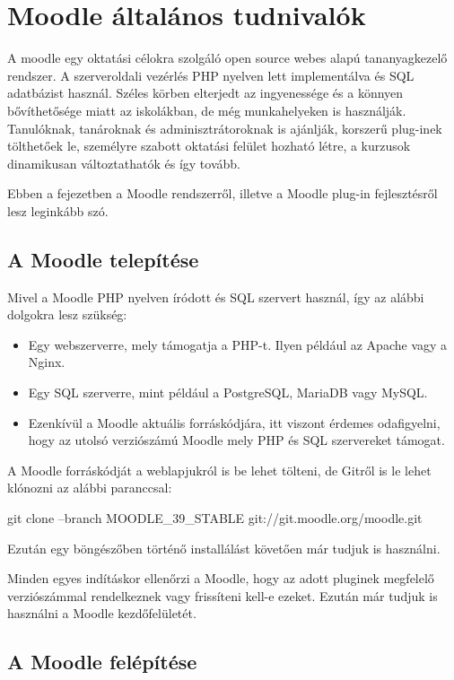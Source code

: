 \chapter{Moodle általános tudnivalók}

A moodle egy oktatási célokra szolgáló open source webes alapú tananyagkezelő rendszer. A szerveroldali vezérlés PHP nyelven lett implementálva és SQL adatbázist használ. Széles körben elterjedt az ingyenessége és a könnyen bővíthetősége miatt az iskolákban, de még munkahelyeken is használják. Tanulóknak, tanároknak és adminisztrátoroknak is ajánlják, korszerű plug-inek tölthetőek le, személyre szabott oktatási felület hozható létre, a kurzusok dinamikusan változtathatók és így tovább. \par
Ebben a fejezetben a Moodle rendszerről, illetve a Moodle plug-in fejlesztésről lesz leginkább szó.

\section{A Moodle telepítése}

Mivel a Moodle PHP nyelven íródott és SQL szervert használ, így az alábbi dolgokra lesz szükség:
\begin{itemize}
    \item Egy webszerverre, mely támogatja a PHP-t. Ilyen például az Apache vagy a Nginx.
    \item Egy SQL szerverre, mint például a PostgreSQL, MariaDB vagy MySQL.
    \item Ezenkívül a Moodle aktuális forráskódjára, itt viszont érdemes odafigyelni, hogy az utolsó verziószámú Moodle mely PHP és SQL szervereket támogat.
\end{itemize}

A Moodle forráskódját a weblapjukról is be lehet tölteni, de Gitről is le lehet klónozni az alábbi paranccsal:

\begin{center}
git clone --branch MOODLE\_39\_STABLE git://git.moodle.org/moodle.git
\end{center}

Ezután egy böngészőben történő installálást követően már tudjuk is használni.\par
Minden egyes indításkor ellenőrzi a Moodle, hogy az adott pluginek megfelelő verziószámmal rendelkeznek vagy frissíteni kell-e ezeket. Ezután már tudjuk is használni a Moodle kezdőfelületét.

\section{A Moodle felépítése}

